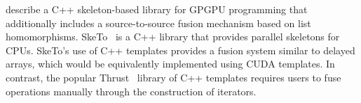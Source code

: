 \citet{Sato:2009cq} describe a C++ skeleton-based library for GPGPU programming
that additionally includes a source-to-source fusion mechanism based on list
homomorphisms. SkeTo~\cite{Matsuzaki:2011ew} is a C++ library that provides
parallel skeletons for CPUs. SkeTo's use of C++ templates provides a fusion
system similar to delayed arrays, which would be equivalently implemented using
CUDA templates. In contrast, the popular Thrust~\cite{ThrustAParallelT:ub}
library of C++ templates requires users to fuse operations manually through the
construction of iterators.




%
%
%
%
%
